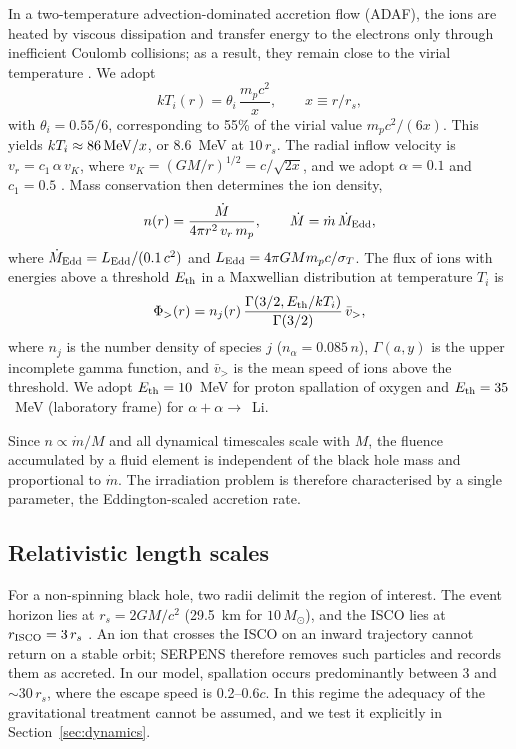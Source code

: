 \documentclass[twocolumn,showpacs,preprintnumbers,amsmath,amssymb]{revtex4}
\begin{document}
In a two-temperature advection-dominated accretion flow (ADAF), the ions are heated by viscous dissipation and transfer energy to the electrons only through inefficient Coulomb collisions; as a result, they remain close to the virial temperature \cite{NarayanYi_1995,NMQ1998}. We adopt
\begin{equation}
\label{eq:Ti}
kT_i(r) = \theta_i\,\frac{m_p c^2}{x}, \qquad x \equiv r/r_s ,
\end{equation}
with $\theta_i = 0.55/6$, corresponding to 55\% of the virial value $m_p c^2/(6x)$. This yields $kT_i\approx 86\,{\rm MeV}/x$, or 8.6~MeV at $10\,r_s$. The radial inflow velocity is $v_r = c_1\,\alpha\, v_K$, where $v_K = (GM/r)^{1/2} = c/\sqrt{2x}$, and we adopt $\alpha=0.1$ and $c_1=0.5$ \cite{NMQ1998}. Mass conservation then determines the ion density,
\begin{equation}
\label{eq:density}
n(r) = \frac{\dot M}{4\pi r^2\, v_r\, m_p}, \qquad \dot M = \dot m\, \dot M_{\rm Edd},
\end{equation}
where $\dot M_{\rm Edd} = L_{\rm Edd}/(0.1\,c^2)$ and $L_{\rm Edd} = 4\pi G M m_p c/\sigma_T$. The flux of ions with energies above a threshold $E_{\rm th}$ in a Maxwellian distribution at temperature $T_i$ is
\begin{equation}
\label{eq:flux}
\Phi_{>}(r) = n_j(r)\, \frac{\Gamma(3/2, E_{\rm th}/kT_i)}{\Gamma(3/2)}\, \bar v_{>} ,
\end{equation}
where $n_j$ is the number density of species $j$ ($n_\alpha = 0.085\,n$), $\Gamma(a,y)$ is the upper incomplete gamma function, and $\bar v_{>}$ is the mean speed of ions above the threshold. We adopt $E_{\rm th}=10$~MeV for proton spallation of oxygen and $E_{\rm th}=35$~MeV (laboratory frame) for $\alpha+\alpha\rightarrow$~Li.

Since $n\propto\dot m/M$ and all dynamical timescales scale with $M$, the fluence accumulated by a fluid element is independent of the black hole mass and proportional to $\dot m$. The irradiation problem is therefore characterised by a single parameter, the Eddington-scaled accretion rate.

\subsection{Relativistic length scales}

For a non-spinning black hole, two radii delimit the region of interest. The event horizon lies at $r_s=2GM/c^2$ (29.5~km for $10\,M_\odot$), and the ISCO lies at $r_{\rm ISCO} = 3\,r_s$ \cite{Bardeen_1972}. An ion that crosses the ISCO on an inward trajectory cannot return on a stable orbit; SERPENS therefore removes such particles and records them as accreted. In our model, spallation occurs predominantly between 3 and $\sim 30\,r_s$, where the escape speed is 0.2--0.6$c$. In this regime the adequacy of the gravitational treatment cannot be assumed, and we test it explicitly in Section~\ref{sec:dynamics}.
\end{document}
